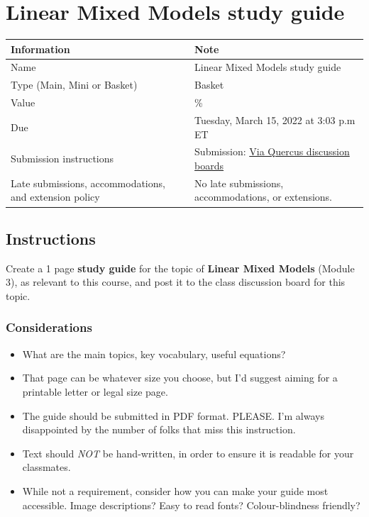 \documentclass[
  openany]{book}
\begin{document}
\hypertarget{linear-mixed-models-study-guide}{%
\section{Linear Mixed Models study guide}\label{linear-mixed-models-study-guide}}

\begin{longtable}[]{@{}
  >{\raggedright\arraybackslash}p{}
  >{\raggedright\arraybackslash}p{}@{}}
\toprule
\textbf{Information} & \textbf{Note} \\
\midrule
\endhead
Name & Linear Mixed Models study guide \\
Type (Main, Mini or Basket) & Basket \\
Value & 1\% \\
Due & Tuesday, March 15, 2022 at 3:03 p.m ET \\
Submission instructions & Submission: \href{https://q.utoronto.ca/courses/253305/discussion_topics/1637653}{Via Quercus discussion boards} \\
Late submissions, accommodations, and extension policy & No late submissions, accommodations, or extensions. \\
\bottomrule
\end{longtable}

\hypertarget{instructions-10}{%
\subsection{Instructions}\label{instructions-10}}

Create a 1 page \textbf{study guide} for the topic of \textbf{Linear Mixed Models} (Module 3), as relevant to this course, and post it to the class discussion board for this topic.

\hypertarget{considerations}{%
\subsubsection{Considerations}\label{considerations}}

\begin{itemize}
\item
  What are the main topics, key vocabulary, useful equations?
\item
  That page can be whatever size you choose, but I'd suggest aiming for a printable letter or legal size page.
\item
  The guide should be submitted in PDF format. PLEASE. I'm always disappointed by the number of folks that miss this instruction.
\item
  Text should \emph{NOT} be hand-written, in order to ensure it is readable for your classmates.
\item
  While not a requirement, consider how you can make your guide most accessible. Image descriptions? Easy to read fonts? Colour-blindness friendly?
\end{itemize}
\end{document}

